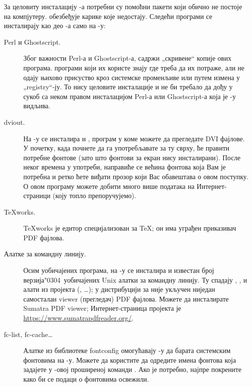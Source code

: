 \documentclass{article}
\begin{document}
За целовиту инсталацију \TL-а потребни су помоћни пакети који обично
не постоје на \Windows{} компјутеру. \TL{} обезбеђује карике које
недостају. Следећи програми се инсталирају као део \TL{}-а само на
\Windows{}-у:
\begin{description}
\item[Perl и Ghostscript.] Због важности Perl-а и Ghostscript-а,
  \TL{} садржи „скривене“ копије ових програма. \TL{} програми који их
  користе знају где треба да их потраже, али не одају њихово присуство
  кроз системске променљиве или путем измена у „registry“-ју. То нису
  целовите инсталације и не би требало да дођу у сукоб са неком правом
  инсталацијом Perl-а или Ghostscript-а која је \Windows{}-у видљива.

\item[dviout.] На \Windows{}-у се инсталира и , програм
  у коме можете да прегледате DVI фајлове. У почетку, када
  почнете да га употребљавате за ту сврху,  ће правити
  потребне фонтове (зато што фонтови за екран нису инсталирани). После
  неког времена у употреби, направиће се већина фонтова која Вам је
  потребна и ретко ћете виђати прозор који Вас обавештава о овом
  поступку. О овом програму можете добити много више података на
  Интернет-страници (коју топло препоручујемо).

\item[\TeX{}works.] \TeX{}works је едитор специјализован за \TeX; он
  има уграђен приказивач PDF фајлова.

\item[Алатке за командну линију.] Осим уобичајених \TL{} програма, на
  \Windows{}-у се инсталира и известан број \Windows{}
  верзија\char"0304\ уобичајених Unix алатки за командну линију. Ту
  спадају , ,  и алати из пројекта
   (, \ldots{});
  у дистрибуцији за \Windows{} није укључен ниједан самосталан
  \textenglish{viewer} (прегледач) PDF фајлова. Можете да
  инсталирате Sumatra PDF viewer; Интернет-страница пројекта је
  \url{https://www.sumatrapdfreader.org/}.

\item[fc-list, fc-cache\ldots{}] Алатке из библиотеке fontconfig
  омогућавају \XeTeX{}-у да барата системским фонтовима на
  \Windows{}-у. Можете да користите  да одредите имена
  фонтова која задајете у \XeTeX-овој проширеној команди . Ако
  је потребно, најпре покрените  како би се подаци о
  фонтовима освежили.

\end{description}
\end{document}
